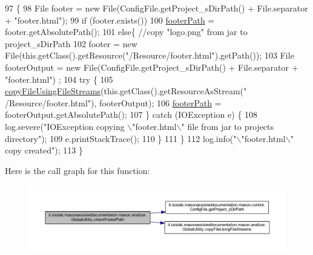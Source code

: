 \begin{DoxyCode}
97                                    \{
98         File footer = \textcolor{keyword}{new} File(ConfigFile.getProject\_sDirPath() + File.separator + \textcolor{stringliteral}{"footer.html"});
99         \textcolor{keywordflow}{if} (footer.exists())
100             \hyperlink{classit_1_1isislab_1_1masonassisteddocumentation_1_1mason_1_1analizer_1_1_global_utility_ae94176856fb4ef24dfaa70423f5fc3f9}{footerPath} = footer.getAbsolutePath();
101         \textcolor{keywordflow}{else}\{ \textcolor{comment}{//copy "logo.png" from jar to project\_sDirPath}
102             footer = \textcolor{keyword}{new} File(this.getClass().getResource(\textcolor{stringliteral}{"/Resource/footer.html"}).getPath());
103             File footerOutput = \textcolor{keyword}{new} File(ConfigFile.getProject\_sDirPath() + File.separator + \textcolor{stringliteral}{"footer.html"})
      ;
104             \textcolor{keywordflow}{try} \{
105                 \hyperlink{classit_1_1isislab_1_1masonassisteddocumentation_1_1mason_1_1analizer_1_1_global_utility_adb83aee7a7166b3826c7f3cf4ada53a9}{copyFileUsingFileStreams}(this.getClass().getResourceAsStream(\textcolor{stringliteral}{"
      /Resource/footer.html"}), footerOutput);
106                 \hyperlink{classit_1_1isislab_1_1masonassisteddocumentation_1_1mason_1_1analizer_1_1_global_utility_ae94176856fb4ef24dfaa70423f5fc3f9}{footerPath} = footerOutput.getAbsolutePath();
107             \} \textcolor{keywordflow}{catch} (IOException e) \{
108                 log.severe(\textcolor{stringliteral}{"IOException copying \(\backslash\)"footer.html\(\backslash\)" file from jar to projects directory"});
109                 e.printStackTrace();
110             \}
111         \}
112         log.info(\textcolor{stringliteral}{"\(\backslash\)"footer.html\(\backslash\)" copy created"});
113     \}
\end{DoxyCode}


Here is the call graph for this function\-:\nopagebreak
\begin{figure}[H]
\begin{center}
\leavevmode
\includegraphics[width=350pt]{classit_1_1isislab_1_1masonassisteddocumentation_1_1mason_1_1analizer_1_1_global_utility_a461e0b0204d6c69a4126947190ca85ef_cgraph}
\end{center}
\end{figure}




